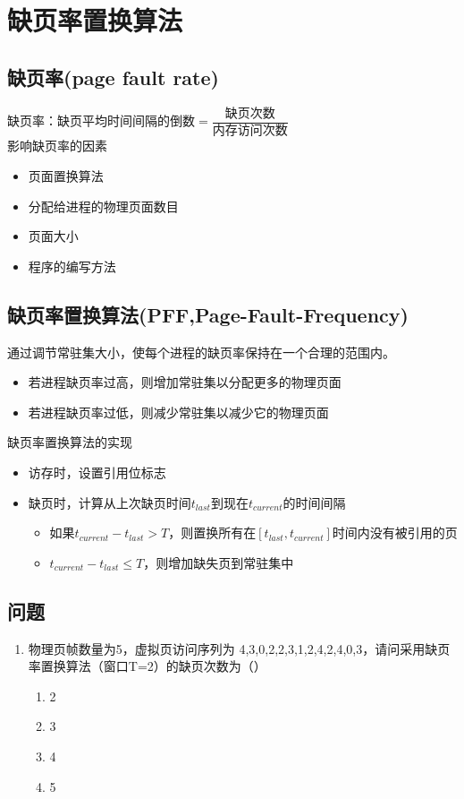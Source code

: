 \section{缺页率置换算法}
\subsection{缺页率(page fault rate)}
缺页率：缺页平均时间间隔的倒数$=\dfrac{\text{缺页次数}}{\text{内存访问次数}}$\\
影响缺页率的因素
\begin{itemize}
	\item 页面置换算法
	\item 分配给进程的物理页面数目
	\item 页面大小
	\item 程序的编写方法
\end{itemize}

\subsection{缺页率置换算法(PFF,Page-Fault-Frequency)}
通过调节常驻集大小，使每个进程的缺页率保持在一个合理的范围内。
\begin{itemize}
	\item 若进程缺页率过高，则增加常驻集以分配更多的物理页面
	\item 若进程缺页率过低，则减少常驻集以减少它的物理页面
\end{itemize}
缺页率置换算法的实现
\begin{itemize}
	\item 访存时，设置引用位标志
	\item 缺页时，计算从上次缺页时间$t_{last}$到现在$t_{current}$的时间间隔
	\begin{itemize}
		\item 如果$t_{current}-t_{last}>T$，则置换所有在$[t_{last},t_{current}]$时间内没有被引用的页
		\item $t_{current}-t_{last}\le T$，则增加缺失页到常驻集中
	\end{itemize}
\end{itemize}
\subsection{问题}
\begin{enumerate}
	\item 物理页帧数量为5，虚拟页访问序列为 4,3,0,2,2,3,1,2,4,2,4,0,3，请问采用缺页率置换算法（窗口T=2）的缺页次数为（）
	\begin{enumerate}[A]
		\item 2
		\item 3
		\item 4
		\item 5
	\end{enumerate}
\end{enumerate}
